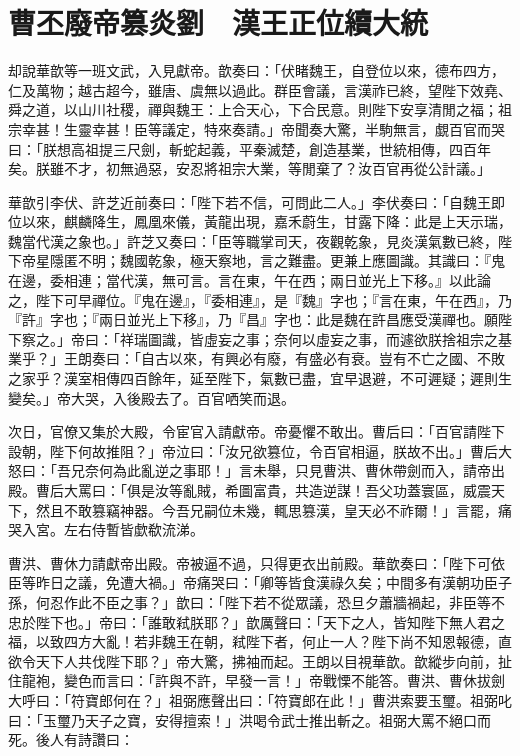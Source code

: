 
\chapter{曹丕廢帝篡炎劉　漢王正位續大統}

却說華歆等一班文武，入見獻帝。歆奏曰：「伏睹魏王，自登位以來，德布四方，仁及萬物；越古超今，雖唐、虞無以過此。群臣會議，言漢祚已終，望陛下效堯、舜之道，以山川社稷，禪與魏王：上合天心，下合民意。則陛下安享清閒之福；祖宗幸甚！生靈幸甚！臣等議定，特來奏請。」帝聞奏大驚，半駒無言，覷百官而哭曰：「朕想高祖提三尺劍，斬蛇起義，平秦滅楚，創造基業，世統相傳，四百年矣。朕雖不才，初無過惡，安忍將祖宗大業，等閒棄了？汝百官再從公計議。」

華歆引李伏、許芝近前奏曰：「陛下若不信，可問此二人。」李伏奏曰：「自魏王即位以來，麒麟降生，鳳凰來儀，黃龍出現，嘉禾蔚生，甘露下降：此是上天示瑞，魏當代漢之象也。」許芝又奏曰：「臣等職掌司天，夜觀乾象，見炎漢氣數已終，陛下帝星隱匿不明；魏國乾象，極天察地，言之難盡。更兼上應圖識。其識曰：『鬼在邊，委相連；當代漢，無可言。言在東，午在西；兩日並光上下移。』以此論之，陛下可早禪位。『鬼在邊』，『委相連』，是『魏』字也；『言在東，午在西』，乃『許』字也；『兩日並光上下移』，乃『昌』字也：此是魏在許昌應受漢禪也。願陛下察之。」帝曰：「祥瑞圖識，皆虛妄之事；奈何以虛妄之事，而遽欲朕捨祖宗之基業乎？」王朗奏曰：「自古以來，有興必有廢，有盛必有衰。豈有不亡之國、不敗之家乎？漢室相傳四百餘年，延至陛下，氣數已盡，宜早退避，不可遲疑；遲則生變矣。」帝大哭，入後殿去了。百官哂笑而退。

次日，官僚又集於大殿，令宦官入請獻帝。帝憂懼不敢出。曹后曰：「百官請陛下設朝，陛下何故推阻？」帝泣曰：「汝兄欲篡位，令百官相逼，朕故不出。」曹后大怒曰：「吾兄奈何為此亂逆之事耶！」言未舉，只見曹洪、曹休帶劍而入，請帝出殿。曹后大罵曰：「俱是汝等亂賊，希圖富貴，共造逆謀！吾父功蓋寰區，威震天下，然且不敢篡竊神器。今吾兄嗣位未幾，輒思篡漢，皇天必不祚爾！」言罷，痛哭入宮。左右侍暫皆歔欷流涕。

曹洪、曹休力請獻帝出殿。帝被逼不過，只得更衣出前殿。華歆奏曰：「陛下可依臣等昨日之議，免遭大禍。」帝痛哭曰：「卿等皆食漢祿久矣；中間多有漢朝功臣子孫，何忍作此不臣之事？」歆曰：「陛下若不從眾議，恐旦夕蕭牆禍起，非臣等不忠於陛下也。」帝曰：「誰敢弒朕耶？」歆厲聲曰：「天下之人，皆知陛下無人君之福，以致四方大亂！若非魏王在朝，弒陛下者，何止一人？陛下尚不知恩報德，直欲令天下人共伐陛下耶？」帝大驚，拂袖而起。王朗以目視華歆。歆縱步向前，扯住龍袍，變色而言曰：「許與不許，早發一言！」帝戰慄不能答。曹洪、曹休拔劍大呼曰：「符寶郎何在？」祖弼應聲出曰：「符寶郎在此！」曹洪索要玉璽。祖弼叱曰：「玉璽乃天子之寶，安得擅索！」洪喝令武士推出斬之。祖弼大罵不絕口而死。後人有詩讚曰：

